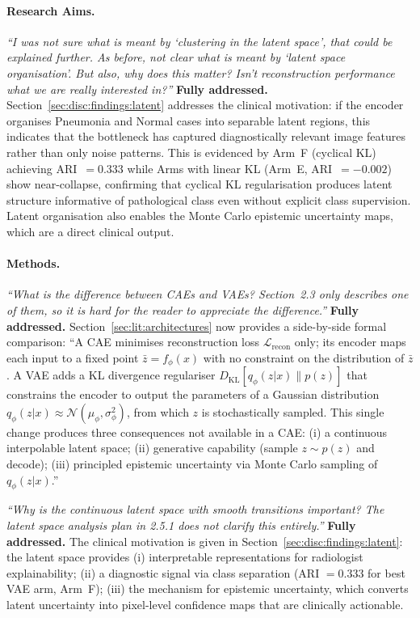 \documentclass[12pt, a4paper, twoside, openright]{book}
\begin{document}
\begin{appendices}
\paragraph{Research Aims.}
\textit{``I was not sure what is meant by `clustering in the latent space', that could be explained further. As before, not clear what is meant by `latent space organisation'. But also, why does this matter? Isn't reconstruction performance what we are really interested in?''}
\textbf{Fully addressed.} Section~\ref{sec:disc:findings:latent} addresses the clinical motivation: if the encoder organises Pneumonia and Normal cases into separable latent regions, this indicates that the bottleneck has captured diagnostically relevant image features rather than only noise patterns. This is evidenced by Arm~F (cyclical KL) achieving ARI~$=0.333$ while Arms with linear KL (Arm~E, ARI~$=-0.002$) show near-collapse, confirming that cyclical KL regularisation produces latent structure informative of pathological class even without explicit class supervision. Latent organisation also enables the Monte Carlo epistemic uncertainty maps, which are a direct clinical output.

\paragraph{Methods.}
\textit{``What is the difference between CAEs and VAEs? Section~2.3 only describes one of them, so it is hard for the reader to appreciate the difference.''}
\textbf{Fully addressed.} Section~\ref{sec:lit:architectures} now provides a side-by-side formal comparison: ``A CAE minimises reconstruction loss $\mathcal{L}_{\mathrm{recon}}$ only; its encoder maps each input to a fixed point $\bar{z} = f_\phi(x)$ with no constraint on the distribution of $\bar{z}$. A VAE adds a KL divergence regulariser $D_{\mathrm{KL}}[q_\phi(z|x) \| p(z)]$ that constrains the encoder to output the parameters of a Gaussian distribution $q_\phi(z|x) \approx \mathcal{N}(\mu_\phi, \sigma^2_\phi)$, from which $z$ is stochastically sampled. This single change produces three consequences not available in a CAE: (i) a continuous interpolable latent space; (ii) generative capability (sample $z \sim p(z)$ and decode); (iii) principled epistemic uncertainty via Monte Carlo sampling of $q_\phi(z|x)$.''

\textit{``Why is the continuous latent space with smooth transitions important? The latent space analysis plan in 2.5.1 does not clarify this entirely.''}
\textbf{Fully addressed.} The clinical motivation is given in Section~\ref{sec:disc:findings:latent}: the latent space provides (i) interpretable representations for radiologist explainability; (ii) a diagnostic signal via class separation (ARI $=0.333$ for best VAE arm, Arm~F); (iii) the mechanism for epistemic uncertainty, which converts latent uncertainty into pixel-level confidence maps that are clinically actionable.


\end{appendices}
\end{document}

